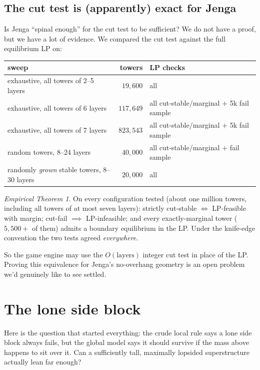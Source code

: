 \documentclass[11pt]{article}
\theoremstyle{definition}
\theoremstyle{remark}
\newtheorem*{empirical}{Empirical Theorem}
\begin{document}
\subsection{The cut test is (apparently) exact for Jenga}

Is Jenga ``spinal enough'' for the cut test to be sufficient? We do not have
a proof, but we have a lot of evidence. We compared the cut test against
the full equilibrium LP on:

\begin{center}
\begin{tabular}{lrl}
\toprule
sweep & towers & LP checks \\
\midrule
exhaustive, all towers of 2--5 layers & $19{,}600$ & all \\
exhaustive, all towers of 6 layers & $117{,}649$ & all cut-stable/marginal $+$ 5k fail sample \\
exhaustive, all towers of 7 layers & $823{,}543$ & all cut-stable/marginal $+$ 5k fail sample \\
random towers, 8--24 layers & $40{,}000$ & all cut-stable/marginal $+$ fail sample \\
randomly \emph{grown} stable towers, 8--30 layers & $20{,}000$ & all \\
\bottomrule
\end{tabular}
\end{center}

\begin{empirical}
On every configuration tested (about one million towers, including all
towers of at most seven layers): strictly cut-stable $\iff$ LP-feasible with
margin; cut-fail $\implies$ LP-infeasible; and every exactly-marginal tower
($5{,}500+$ of them) admits a boundary equilibrium in the LP. Under the
knife-edge convention the two tests agreed \emph{everywhere}.
\end{empirical}

So the game engine may use the $O(\text{layers})$ integer cut test in place
of the LP. Proving this equivalence for Jenga's no-overhang geometry is an
open problem we'd genuinely like to see settled.

\section{The lone side block}

Here is the question that started everything: the crude local rule says a
lone side block always fails, but the global model says it should survive
if the mass above happens to sit over it. Can a sufficiently tall,
maximally lopsided superstructure actually lean far enough?
\end{document}

